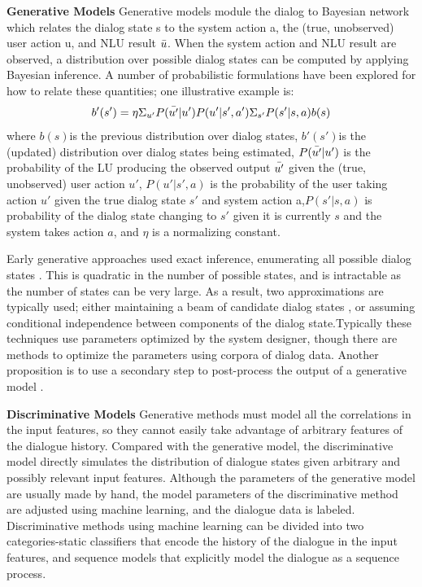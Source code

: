 \documentclass[10pt,twocolumn,letterpaper]{article}
\begin{document}
\textbf{Generative Models}
Generative models module the dialog to Bayesian network which relates  the dialog state s to the system action a, the (true, unobserved) user action u, and NLU result $\Bar{u}$. When the system action and NLU result are observed, a distribution over possible dialog states can be computed by applying Bayesian inference. A number of probabilistic formulations have been explored for how to relate these quantities; one illustrative example is:
\begin{equation}
    b'(s') = \eta \Sigma_{u'} P(\Bar{u'}|u')P(u'|s',a')\Sigma_{s'}P(s'|s,a)b(s) 
    \label{generative}
\end{equation}
where $b(s)$is the previous distribution over dialog states, $b′(s′)$is the (updated) distribution over dialog states being estimated, $P(\Bar{u'}|u')$ is the probability of the LU producing the observed output $\Bar{u'}$ given the (true, unobserved) user action $u′$, $P(u′|s′,a)$ is the probability of the user taking action $u′$ given the true dialog state $s′$ and system action a,$P(s′|s,a)$ is probability of the dialog state changing to $s′$ given it is currently $s$ and the system takes action $a$, and $\eta$ is a normalizing constant.

Early generative approaches used exact inference, enumerating all possible dialog states \cite{roy2000spoken,horvitz1999computational}. This is quadratic in the number of possible states, and is intractable as the number of states can be very large. As a result, two approximations are typically used; either maintaining a beam of candidate dialog states \cite{young2007hidden,williams2007using,henderson2008mixture}, or assuming conditional  independence  between  components  of  the  dialog  state\cite{young2010hidden,bui2009tractable,thomson2010bayesian,williams2010incremental,kadlec2014ibm,kadlec2014knowledge}.Typically these techniques use parameters optimized by the system designer, though there are methods to optimize the parameters using corpora of dialog data\cite{thomson2010parameter,lee2014optimizing}. Another proposition is to use a secondary step to post-process the output of a generative model \cite{kim2013engineering}.

\textbf{Discriminative Models} 
Generative methods must model all the correlations in the input features, so they cannot easily take advantage of arbitrary features of the dialogue history. Compared with the generative model, the  discriminative model directly simulates the distribution of dialogue states given arbitrary and possibly relevant input features. Although the parameters of the generative model are usually made by hand, the model parameters of the  discriminative method are adjusted using machine learning, and the dialogue data is labeled. Discriminative methods using machine learning can be divided into two categories-static classifiers that encode the history of the dialogue in the input features, and sequence models that explicitly model the dialogue as a sequence process.
\end{document}
